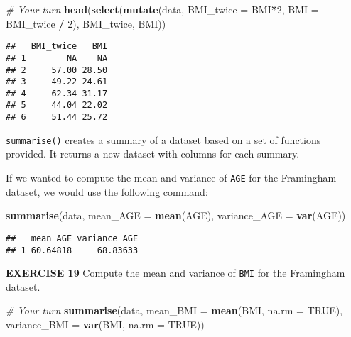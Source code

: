 \documentclass[
]{article}
\newenvironment{Shaded}{\begin{snugshade}}{\end{snugshade}}
\newcommand{\CommentTok}[1]{\textcolor[rgb]{0.56,0.35,0.01}{\textit{#1}}}
\newcommand{\DataTypeTok}[1]{\textcolor[rgb]{0.13,0.29,0.53}{#1}}
\newcommand{\DecValTok}[1]{\textcolor[rgb]{0.00,0.00,0.81}{#1}}
\newcommand{\KeywordTok}[1]{\textcolor[rgb]{0.13,0.29,0.53}{\textbf{#1}}}
\newcommand{\NormalTok}[1]{#1}
\newcommand{\OperatorTok}[1]{\textcolor[rgb]{0.81,0.36,0.00}{\textbf{#1}}}
\newcommand{\OtherTok}[1]{\textcolor[rgb]{0.56,0.35,0.01}{#1}}
\newcommand{\StringTok}[1]{\textcolor[rgb]{0.31,0.60,0.02}{#1}}
\begin{document}
\begin{Shaded}
\begin{Highlighting}[]
\CommentTok{# Your turn}
\KeywordTok{head}\NormalTok{(}\KeywordTok{select}\NormalTok{(}\KeywordTok{mutate}\NormalTok{(data, }\DataTypeTok{BMI_twice =}\NormalTok{ BMI}\OperatorTok{*}\DecValTok{2}\NormalTok{,}
                   \DataTypeTok{BMI =}\NormalTok{ BMI_twice }\OperatorTok{/}\StringTok{ }\DecValTok{2}\NormalTok{), BMI_twice, BMI))}
\end{Highlighting}
\end{Shaded}

\begin{verbatim}
##   BMI_twice   BMI
## 1        NA    NA
## 2     57.00 28.50
## 3     49.22 24.61
## 4     62.34 31.17
## 5     44.04 22.02
## 6     51.44 25.72
\end{verbatim}

\texttt{summarise()} creates a summary of a dataset based on a set of
functions provided. It returns a new dataset with columns for each
summary.

If we wanted to compute the mean and variance of \texttt{AGE} for the
Framingham dataset, we would use the following command:

\begin{Shaded}
\begin{Highlighting}[]
\KeywordTok{summarise}\NormalTok{(data, }\DataTypeTok{mean_AGE =} \KeywordTok{mean}\NormalTok{(AGE), }\DataTypeTok{variance_AGE =} \KeywordTok{var}\NormalTok{(AGE))}
\end{Highlighting}
\end{Shaded}

\begin{verbatim}
##   mean_AGE variance_AGE
## 1 60.64818     68.83633
\end{verbatim}

\textbf{EXERCISE 19} Compute the mean and variance of \texttt{BMI} for
the Framingham dataset.

\begin{Shaded}
\begin{Highlighting}[]
\CommentTok{# Your turn}
\KeywordTok{summarise}\NormalTok{(data, }\DataTypeTok{mean_BMI =} \KeywordTok{mean}\NormalTok{(BMI, }\DataTypeTok{na.rm =} \OtherTok{TRUE}\NormalTok{), }\DataTypeTok{variance_BMI =} \KeywordTok{var}\NormalTok{(BMI, }\DataTypeTok{na.rm =} \OtherTok{TRUE}\NormalTok{))}
\end{Highlighting}
\end{Shaded}
\end{document}
